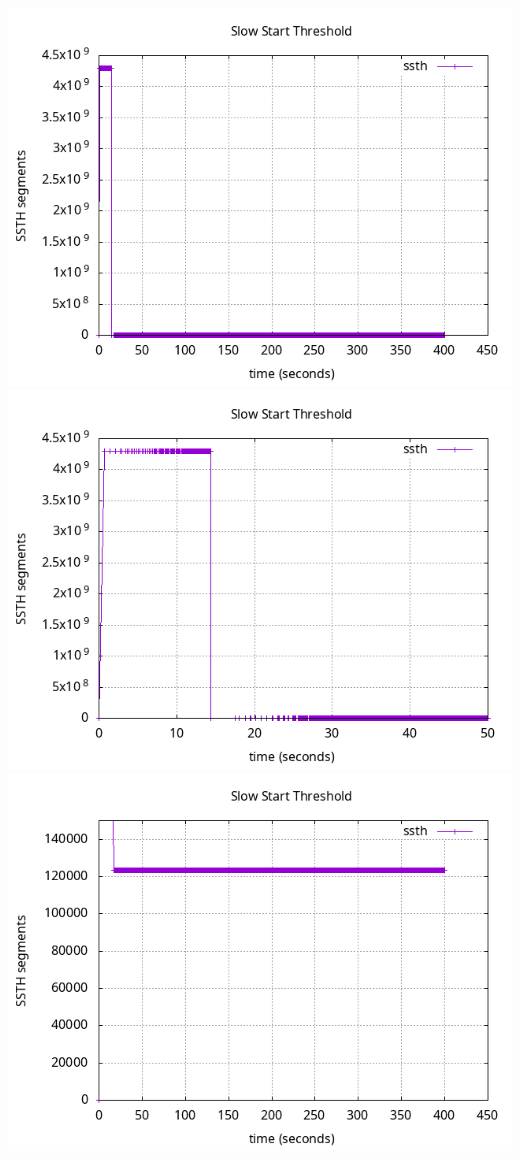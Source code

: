 \documentclass{article}
\begin{document}
\includegraphics[scale=0.5]{plots/lab1-group5-task1-experimentC-question1.1.png}
\includegraphics[scale=0.5]{plots/lab1-group5-task1-experimentC-question1.1-xrange-0-50.png}
\includegraphics[scale=0.5]{plots/lab1-group5-task1-experimentC-question1.1-yrange-0-150000.png}
\end{document}
